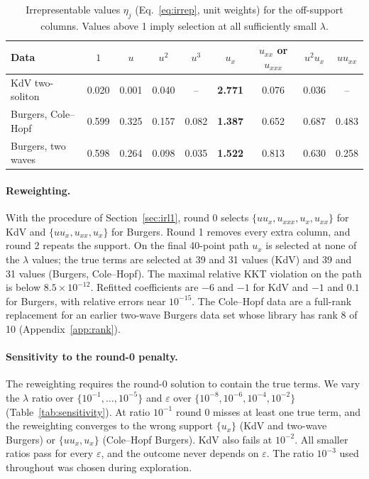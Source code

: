 \documentclass{article}
\begin{document}
\begin{table}[t]
\caption{Irrepresentable values $\eta_j$ (Eq.~\ref{eq:irrep}, unit weights) for the off-support columns. Values above 1 imply selection at all sufficiently small $\lambda$.}
\label{tab:irrep}
\centering
\small
\begin{tabular}{lcccccccc}
\toprule
Data & $1$ & $u$ & $u^2$ & $u^3$ & $u_x$ & $u_{xx}$ or $u_{xxx}$ & $u^2u_x$ & $uu_{xx}$ \\
\midrule
KdV two-soliton & 0.020 & 0.001 & 0.040 & -- & \textbf{2.771} & 0.076 & 0.036 & -- \\
Burgers, Cole--Hopf & 0.599 & 0.325 & 0.157 & 0.082 & \textbf{1.387} & 0.652 & 0.687 & 0.483 \\
Burgers, two waves & 0.598 & 0.264 & 0.098 & 0.035 & \textbf{1.522} & 0.813 & 0.630 & 0.258 \\
\bottomrule
\end{tabular}
\end{table}

\paragraph{Reweighting.}
With the procedure of Section~\ref{sec:irl1}, round 0 selects $\{uu_x, u_{xxx}, u_x, u_{xx}\}$ for KdV and $\{uu_x, u_{xx}, u_x\}$ for Burgers. Round 1 removes every extra column, and round 2 repeats the support. On the final 40-point path $u_x$ is selected at none of the $\lambda$ values; the true terms are selected at 39 and 31 values (KdV) and 39 and 31 values (Burgers, Cole--Hopf). The maximal relative KKT violation on the path is below $8.5\times 10^{-12}$. Refitted coefficients are $-6$ and $-1$ for KdV and $-1$ and $0.1$ for Burgers, with relative errors near $10^{-15}$. The Cole--Hopf data are a full-rank replacement for an earlier two-wave Burgers data set whose library has rank 8 of 10 (Appendix~\ref{app:rank}).

\paragraph{Sensitivity to the round-0 penalty.}
The reweighting requires the round-0 solution to contain the true terms. We vary the $\lambda$ ratio over $\{10^{-1},\dots,10^{-5}\}$ and $\varepsilon$ over $\{10^{-8},10^{-6},10^{-4},10^{-2}\}$ (Table~\ref{tab:sensitivity}). At ratio $10^{-1}$ round 0 misses at least one true term, and the reweighting converges to the wrong support $\{u_x\}$ (KdV and two-wave Burgers) or $\{uu_x, u_x\}$ (Cole--Hopf Burgers). KdV also fails at $10^{-2}$. All smaller ratios pass for every $\varepsilon$, and the outcome never depends on $\varepsilon$. The ratio $10^{-3}$ used throughout was chosen during exploration.
\end{document}
